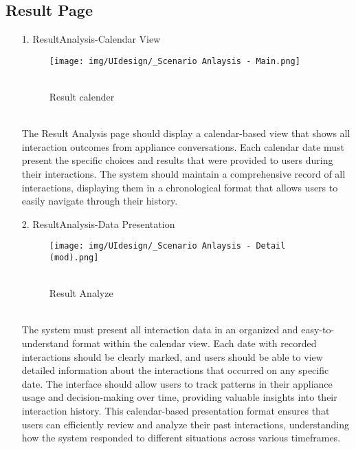 \documentclass[conference]{IEEEtran}
\begin{document}
\subsection{Result Page}
    \begin{enumerate}
        \item[1.] ResultAnalysis-Calendar View
        \begin{figure}[h]
\hspace{1.5cm}
\centering
\begin{minipage}{0.4\columnwidth}
    \texttt{[image: img/UIdesign/\_Scenario Anlaysis - Main.png]}
    \caption{\\ Result calender}
\end{minipage}
\end{figure}
        \\ The Result Analysis page should display a calendar-based view that shows all interaction outcomes from appliance conversations. Each calendar date must present the specific choices and results that were provided to users during their interactions. The system should maintain a comprehensive record of all interactions, displaying them in a chronological format that allows users to easily navigate through their history.\\
    \end{enumerate}
    
    \begin{enumerate}
        \item[2.] ResultAnalysis-Data 
        Presentation
        \begin{figure}[h]
\hspace{1.5cm}
\centering
\begin{minipage}{0.4\columnwidth}
    \texttt{[image: img/UIdesign/\_Scenario Anlaysis - Detail (mod).png]}
    \caption{\\ Result Analyze}
\end{minipage}
\end{figure}
        \\ The system must present all interaction data in an organized and easy-to-understand format within the calendar view. Each date with recorded interactions should be clearly marked, and users should be able to view detailed information about the interactions that occurred on any specific date. The interface should allow users to track patterns in their appliance usage and decision-making over time, providing valuable insights into their interaction history. This calendar-based presentation format ensures that users can efficiently review and analyze their past interactions, understanding how the system responded to different situations across various timeframes. 
    \end{enumerate}
\end{document}
